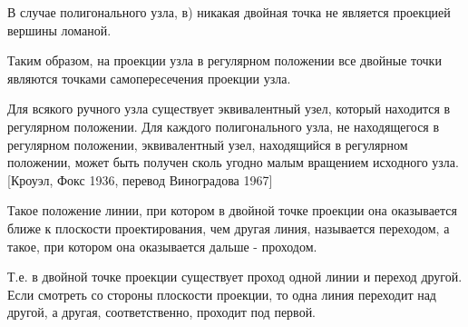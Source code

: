В случае полигонального узла, в) никакая двойная точка не является проекцией вершины ломаной.

Таким образом, на проекции узла в регулярном положении все двойные точки являются точками самопересечения проекции узла.

Для всякого ручного узла существует эквивалентный узел, который находится в регулярном положении.
Для каждого полигонального узла, не находящегося в регулярном положении, эквивалентный узел, находящийся в регулярном положении, может быть получен сколь угодно малым вращением исходного узла. [Кроуэл, Фокс 1936, перевод Виноградова 1967]

Такое положение линии, при котором в двойной точке проекции она оказывается ближе к плоскости проектирования, чем другая линия, называется переходом, а такое, при котором она оказывается дальше - проходом. 

Т.е. в двойной точке проекции существует проход одной линии и переход другой. Если смотреть со стороны плоскости проекции, то одна линия переходит над другой, а другая, соответственно, проходит под первой.



